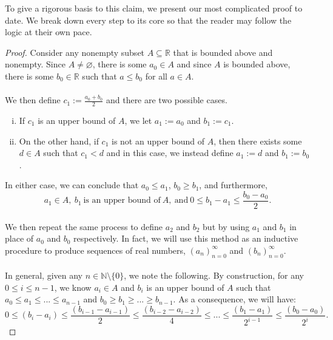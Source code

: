 \documentclass[12pt]{article}
\theoremstyle{definition}
\theoremstyle{remark}
\begin{document}
\noindent To give a rigorous basis to this claim, we present our most complicated proof to date. We break down every step to its core so that the reader may follow the logic at their own pace.
\begin{proof} Consider any nonempty subset $A\subseteq\mathbb{R}$ that is bounded above and nonempty. Since $A\neq\varnothing$, there is some $a_0\in A$ and since $A$ is bounded above, there is some $b_0\in\mathbb{R}$ such that $a\leq b_0$ for all $a\in A$.\\\\
We then define $c_1:=\frac{a_0+b_0}{2}$ and there are two possible cases.
        \begin{enumerate}[(i)]
            \item If $c_1$ is an upper bound of $A$, we let $a_1:=a_0$ and $b_1:=c_1$.
            \item On the other hand, if $c_1$ is not an upper bound of $A$, then there exists some $d\in A$ such that $c_1<d$ and in this case, we instead define $a_1:=d$ and $b_1:=b_0$.
        \end{enumerate}
In either case, we can conclude that $a_0\leq a_1$, $b_0\geq b_1$, and furthermore,
$$a_1\in A,\ b_1\ \text{is an upper bound of}\ A,\ \text{and}\ 0\leq b_1-a_1\leq\frac{b_0-a_0}{2}.$$\\
We then repeat the same process to define $a_2$ and $b_2$ but by using $a_1$ and $b_1$ in place of $a_0$ and $b_0$ respectively. In fact, we will use this method as an inductive procedure to produce sequences of real numbers, $(a_n)_{n=0}^\infty$ and $(b_n)_{n=0}^\infty$.\\\\
In general, given any $n\in\mathbb{N}\setminus\{0\}$, we note the following. By construction, for any $0\leq i\leq n-1$, we know $a_i\in A$ and $b_i$ is an upper bound of $A$ such that $a_0\leq a_1\leq ...\leq a_{n-1}$ and $b_0\geq b_1\geq ...\geq b_{n-1}$. As a consequence, we will have: $$0\leq (b_i-a_i)\leq\frac{(b_{i-1}-a_{i-1})}{2}\leq\frac{(b_{i-2}-a_{i-2})}{4}\leq...\leq\frac{(b_{1}-a_{1})}{2^{i-1}} \leq\frac{(b_{0}-a_{0})}{2^i}.$$


\end{proof}
\end{document}
